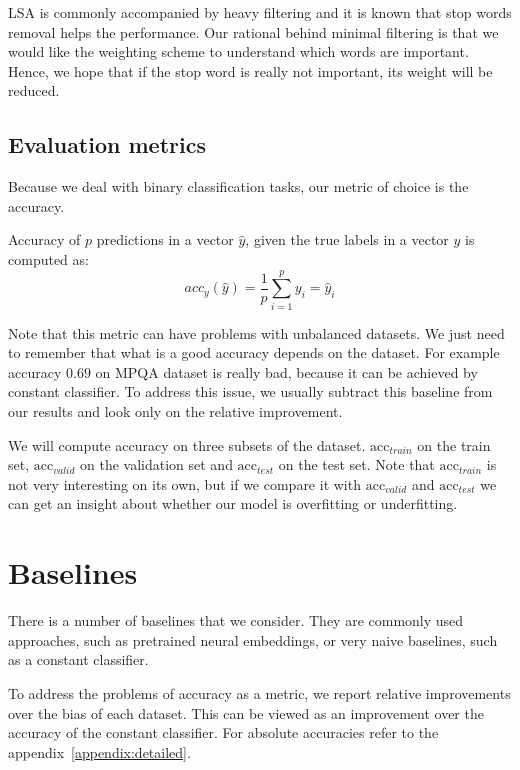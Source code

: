     LSA is commonly accompanied by heavy filtering and it is known that stop words removal helps the performance.
    Our rational behind minimal filtering is that we would like the weighting scheme to understand which words are important.
    Hence, we hope that if the stop word is really not important, its weight will be reduced.
    
    \subsection{Evaluation metrics}
    
    Because we deal with binary classification tasks, our metric of choice is the accuracy.
    
    Accuracy of $p$ predictions in a vector $\hat{y}$, given the true labels in a vector $y$ is computed as:
    $$acc_y(\hat{y}) = \frac{1}{p}\sum_{i=1}^py_i =\hat{y}_i$$
    
    Note that this metric can have problems with unbalanced datasets. 
    We just need to remember that what is a good accuracy depends on the dataset.
    For example accuracy $0.69$ on MPQA dataset is really bad, because it can be achieved by constant classifier.
    To address this issue, we usually subtract this baseline from our results and look only on the relative improvement. 
    
    We will compute accuracy on three subsets of the dataset. 
    $\mathrm{acc}_{train}$ on the train set, $\mathrm{acc}_{valid}$ on the validation set and $\mathrm{acc}_{test}$ on the test set.
    Note that $\mathrm{acc}_{train}$ is not very interesting on its own, but if we compare it with $\mathrm{acc}_{valid}$ and $\mathrm{acc}_{test}$ we can get an insight about whether our model is overfitting or underfitting.


\section{Baselines} \label{sec:baseline}

    There is a number of baselines that we consider.
    They are commonly used approaches, such as pretrained neural embeddings, or very naive baselines, such as a constant classifier.
    
    To  address the problems of accuracy as a metric, we report relative improvements over the bias of each dataset.
    This can be viewed as an improvement over the accuracy of the constant classifier.
    For absolute accuracies refer to the appendix~\ref{appendix:detailed}. 

